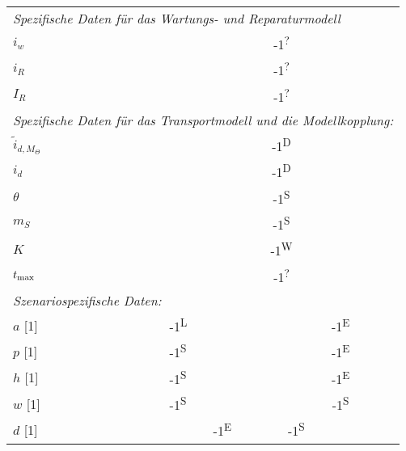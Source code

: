 \begin{longtable}{p{4cm} p{} p{} p{} }
    \multicolumn{4}{l}{\textit{Spezifische Daten für das Wartungs- und
    Reparaturmodell}}\\
    $i_w$ &\multicolumn{3}{c}{ -1\textsuperscript{?}}\\
    $i_R$ &\multicolumn{3}{c}{ -1\textsuperscript{?}}\\
    $I_R$ &\multicolumn{3}{c}{ -1\textsuperscript{?}}\\

    \multicolumn{4}{l}{\textit{Spezifische Daten für das Transportmodell und
        die Modellkopplung:}}\\
    $\tilde{i}_{d, M_\Theta}$ &\multicolumn{3}{c}{ 
                                        -1\textsuperscript{D}}\\
    $i_d$ &\multicolumn{3}{c}{          -1\textsuperscript{D}}\\
    $\theta$ &\multicolumn{3}{c}{       -1\textsuperscript{S}}\\
    $m_S$ &\multicolumn{3}{c}{          -1\textsuperscript{S}}\\
    $K$ &\multicolumn{3}{c}{            -1\textsuperscript{W}}\\
    $t_\text{max}$ &\multicolumn{3}{c}{      -1\textsuperscript{?}}\\

    \multicolumn{4}{l}{\textit{Szenariospezifische Daten:}}\\
    $a$ [1] &                       -1\textsuperscript{L}
            &\multicolumn{2}{c}{    -1\textsuperscript{E}}\\
    $p$ [1] &                       -1\textsuperscript{S} 
            &\multicolumn{2}{c}{    -1\textsuperscript{E}}\\
    $h$ [1] &                       -1\textsuperscript{S} 
            &\multicolumn{2}{c}{    -1\textsuperscript{E}}\\
    $w$ [1] &                       -1\textsuperscript{S} 
            &\multicolumn{2}{c}{    -1\textsuperscript{S}}\\
    $d$ [1] &\multicolumn{2}{c}{    -1\textsuperscript{E}}
            &                       -1\textsuperscript{S} 
\end{longtable}
